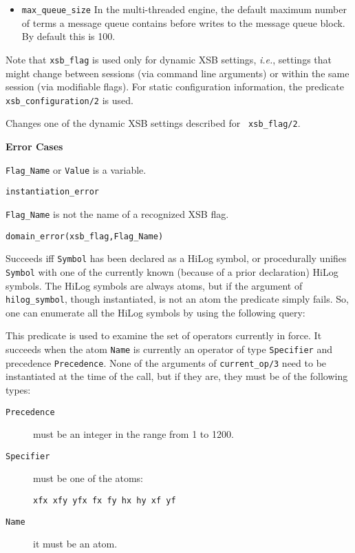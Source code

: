 \begin{description}
\begin{itemize}
\item {\tt max\_queue\_size} In the multi-threaded engine, the default
  maximum number of terms a message queue contains before writes to
  the message queue block.  By default this is 100.

\end{itemize}
    
Note that {\tt xsb\_flag} is used only for dynamic XSB settings, {\it
  i.e.}, settings that might change between sessions (via command line
arguments) or within the same session (via modifiable flags).  For
static configuration information, the predicate {\tt
  xsb\_configuration/2} is used. 


%
Changes one of the dynamic XSB settings described for {\tt
  xsb\_flag/2}.

{\bf Error Cases}
\bi
\item 	{\tt Flag\_Name} or {\tt Value} is a variable.
\bi
\item 	{\tt instantiation\_error}
\ei
%
\item 	{\tt Flag\_Name} is not the name of a recognized XSB flag.
\bi
\item 	{\tt domain\_error(xsb\_flag,Flag\_Name)}
\ei

\ei


    Succeeds iff {\tt Symbol} has been declared as a HiLog symbol, or 
    procedurally unifies {\tt Symbol} with one of the currently known 
    (because of a prior declaration) HiLog symbols. The HiLog symbols
    are always atoms, but if the argument of {\tt hilog\_symbol},
    though instantiated, is not an atom the predicate simply fails.
    So, one can enumerate all the HiLog symbols by using the following
    query:


    This predicate is used to examine the set of operators currently
    in force.  It succeeds when the atom {\tt Name} is currently an
    operator of type {\tt Specifier} and precedence {\tt Precedence}.  None
    of the arguments of {\tt current\_op/3} need to be instantiated at
    the time of the call, but if they are, they must be of the
    following types: 
\begin{description}
\item[{\tt Precedence}] must be an integer in the range from 1 to 1200.  
\item[{\tt Specifier}] must be one of the atoms: 
\begin{verbatim} 
xfx xfy yfx fx fy hx hy xf yf 
\end{verbatim} 
\item[{\tt Name}] it must be an atom.
\end{description}


\end{description}
